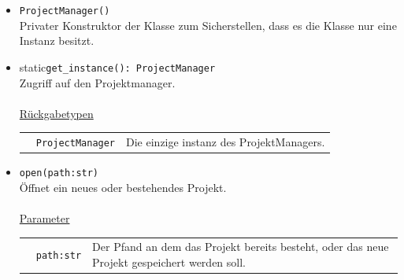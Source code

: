 \documentclass{article}
\begin{document}
\begin{itemize}
\item \texttt{ProjectManager()}\\ Privater Konstruktor der Klasse zum Sicherstellen, dass es die Klasse nur eine Instanz besitzt.

\item \flqq{}static\frqq \texttt{get\_instance(): ProjectManager}\\ Zugriff auf den Projektmanager.\\\\
\underline{{Rückgabetypen}}\\
\begin{tabular}{llp{8.5cm}}
 & \texttt{ProjectManager} & Die einzige instanz des ProjektManagers. \\
\end{tabular}
\item \texttt{open(path:str)}\\ Öffnet ein neues oder bestehendes Projekt.\\\\
\underline{{Parameter}}\\
\begin{tabular}{llp{8.5cm}}
 & \texttt{path:str} & Der Pfand an dem das Projekt bereits besteht, oder das neue Projekt gespeichert werden soll. \\
\end{tabular}


\end{itemize}
\end{document}
